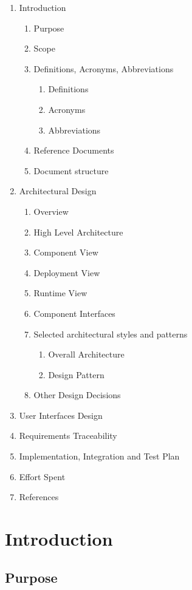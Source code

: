 \documentclass{article}
\begin{document}
	\begin{enumerate}
			\item Introduction
			\begin{enumerate}
				\item Purpose
				\item Scope
				\item Definitions, Acronyms, Abbreviations
				\begin{enumerate}
					\item Definitions
					\item Acronyms
					\item Abbreviations
				\end{enumerate}
				\item Reference Documents
				\item Document structure
			\end{enumerate}
			\item Architectural Design
			\begin{enumerate}
				\item Overview
				\item High Level Architecture
				\item Component View
				\item Deployment View
				\item Runtime View
				\item Component Interfaces
				\item Selected architectural styles and patterns
				\begin{enumerate}
				\item Overall Architecture
				\item Design Pattern
				\end{enumerate}
				\item Other Design Decisions
			\end{enumerate}
			\item User Interfaces Design
			\item Requirements Traceability
			\item Implementation, Integration and Test Plan
			\item Effort Spent
			\item References
	\end{enumerate}
	\newpage
\section{Introduction}
\subsection{Purpose}
\end{document}
